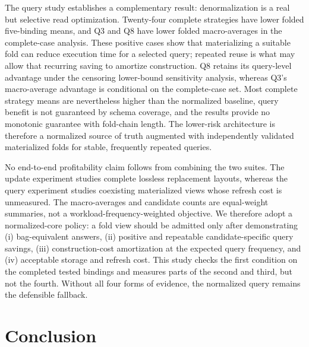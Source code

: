 \documentclass[sigconf]{acmart}
\begin{document}
The query study establishes a complementary result: denormalization is a real
but selective read optimization. Twenty-four complete strategies have lower
folded five-binding means, and Q3 and Q8 have lower folded macro-averages in
the complete-case analysis. These positive cases show that materializing a
suitable fold can reduce execution time for a selected query; repeated reuse is
what may allow that recurring saving to amortize construction. Q8 retains its
query-level advantage under the censoring lower-bound sensitivity analysis,
whereas Q3's macro-average advantage is conditional on the complete-case set.
Most complete strategy means are nevertheless higher than the normalized
baseline, query benefit is not guaranteed by schema coverage, and the results
provide no monotonic guarantee with fold-chain length. The lower-risk
architecture is therefore a normalized source of truth augmented with
independently validated materialized folds for stable, frequently repeated
queries.

No end-to-end profitability claim follows from combining the two suites. The
update experiment studies complete lossless replacement layouts, whereas the query
experiment studies coexisting materialized views whose refresh cost is
unmeasured. The macro-averages and candidate counts are equal-weight summaries,
not a workload-frequency-weighted objective. We therefore adopt a
normalized-core policy: a fold view should be admitted only after demonstrating
(i) bag-equivalent answers, (ii) positive and repeatable candidate-specific
query savings, (iii) construction-cost amortization at the expected query
frequency, and (iv) acceptable storage and refresh cost. This study checks the
first condition on the completed tested
bindings and measures parts of the second and third, but not the fourth.
Without all four forms of evidence, the normalized query remains the defensible
fallback.

\section{Conclusion}
\end{document}
